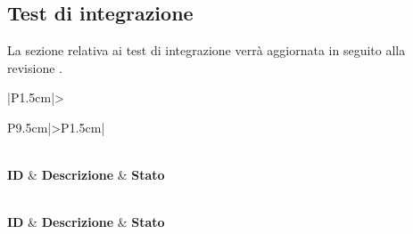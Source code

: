 \subsection{Test di integrazione}

\par La sezione relativa ai test di integrazione verrà aggiornata in seguito alla revisione .

\bgroup
\begin{adjustwidth}{-0.5cm}{-0.5cm}
 	\begin{longtable}{|P{1.5cm}|>{\raggedright}P{9.5cm}|>{\arraybackslash}P{1.5cm}|}
		\caption{Test di integrazione}
  	\label{tab:test-integrazione} \\
	  \hline
		\textbf{ID} & \textbf{Descrizione} & \textbf{Stato} \\ 
		\hline
		\endfirsthead

		\caption[]{Test di integrazione (continua)} \\
		\hline
		\textbf{ID} & \textbf{Descrizione} & \textbf{Stato} \\ 
		\hline
		\endhead

		\hline
		 \\ 
		\hline
		\endfoot

		\hline
		\endlastfoot



\end{longtable}
\end{adjustwidth}
